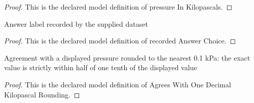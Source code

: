\begin{proof}
  This is the declared model definition of pressure In Kilopascals.
\end{proof}
\begin{definition}
  \label{def:physics:phyx-mini-0400:phyxminiproblems-problemphyxmini0400-recordedanswerchoice}
  Answer label recorded by the supplied dataset
\end{definition}
\begin{proof}
  This is the declared model definition of recorded Answer Choice.
\end{proof}
\begin{definition}
  \label{def:physics:phyx-mini-0400:phyxminiproblems-problemphyxmini0400-agreeswithonedecimalkilopascalrounding}
  Agreement with a displayed pressure rounded to the nearest 0.1 kPa: the exact value is strictly within half of one tenth of the displayed value
\end{definition}
\begin{proof}
  This is the declared model definition of Agrees With One Decimal Kilopascal Rounding.
\end{proof}
